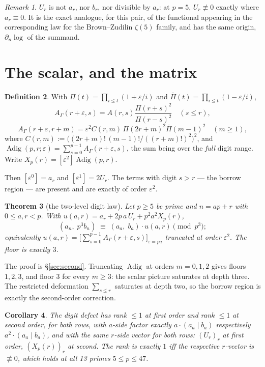 \documentclass[11pt,a4paper]{amsart}
\theoremstyle{plain}
\newtheorem{theorem}{Theorem}[section]
\newtheorem{corollary}[theorem]{Corollary}
\theoremstyle{definition}
\newtheorem{definition}[theorem]{Definition}
\theoremstyle{remark}
\newtheorem{remark}[theorem]{Remark}
\newcommand{\A}{A}
\begin{document}
\begin{remark}
$U_r$ is not $a_r$, nor $b_r$, nor divisible by $a_r$: at $p=5$, $U_r\not\equiv0$ exactly
where $a_r\equiv0$. It is the exact analogue, for this pair, of the functional appearing
in the corresponding law for the Brown--Zudilin $\zeta(5)$ family, and has the same
origin, $\partial_n\log$ of the summand.
\end{remark}

\section{The scalar, and the matrix}

\begin{definition}\label{def:adig}
With $\Pi(t)=\prod_{i\le t}(1+\varepsilon/i)$ and $\bar\Pi(t)=\prod_{i\le t}(1-\varepsilon/i)$,
\[
  \A_\Gamma(r+\varepsilon,s)=\A(r,s)\frac{\Pi(r+s)^2}{\Pi(r-s)^2}\quad(s\le r),
\]
\[
  \A_\Gamma(r+\varepsilon,r+m)=\varepsilon^2 C(r,m)\,\Pi(2r+m)^2\bar\Pi(m-1)^2
  \quad(m\ge1),
\]
where $C(r,m):=\bigl((2r+m)!\,(m-1)!/((r+m)!)^2\bigr)^{2}$,
and $\operatorname{Adig}(p,r;\varepsilon)=\sum_{s=0}^{p-1}\A_\Gamma(r+\varepsilon,s)$, the sum
being over the \emph{full} digit range. Write $X_p(r)=[\varepsilon^2]\operatorname{Adig}(p,r)$.
\end{definition}

Then $[\varepsilon^0]=a_r$ and $[\varepsilon^1]=2U_r$. The terms with digit $s>r$ — the
borrow region — are present and are exactly of order $\varepsilon^2$.

\begin{theorem}[the two-level digit law]\label{thm:scalar}
Let $p\ge5$ be prime and $n=ap+r$ with $0\le a,r<p$. With
$u(a,r)=a_r+2p\,a\,U_r+p^2a^2X_p(r)$,
\[
  (a_n,\;p^3b_n)\;\equiv\;(a_a,\;b_a)\cdot u(a,r) \pmod{p^3};
\]
equivalently $u(a,r)=\bigl[\sum_{s=0}^{p-1}\A_\Gamma(r+\varepsilon,s)\bigr]_{\varepsilon=pa}$
truncated at order $\varepsilon^2$. The floor is exactly $3$.
\end{theorem}

The proof is \S\ref{sec:second}. Truncating $\operatorname{Adig}$ at orders $m=0,1,2$
gives floors $1,2,3$, and floor $3$ for every $m\ge3$: the scalar picture saturates at
depth three. The restricted deformation $\sum_{s\le r}$ saturates at depth two, so the
borrow region is exactly the second-order correction.

\begin{corollary}\label{cor:rank}
The digit defect has rank $\le1$ at first order and rank $\le1$ at second order, for both
rows, with $a$-side factor exactly $a\cdot(a_a\mid b_a)$ respectively
$a^2\cdot(a_a\mid b_a)$, and with the \emph{same} $r$-side vector for both rows:
$(U_r)_r$ at first order, $(X_p(r))_r$ at second. The rank is exactly $1$ iff the
respective $r$-vector is $\not\equiv0$, which holds at all 13 primes $5\le p\le47$.
\end{corollary}
\end{document}
